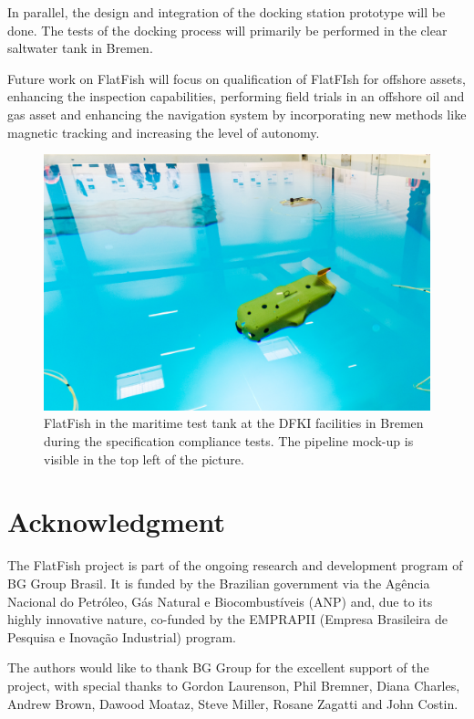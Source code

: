 \documentclass[conference]{IEEEtran}
\begin{document}
In parallel, the design and integration of the docking station prototype will be done. The 
tests of the docking process will primarily be performed in the clear saltwater tank in Bremen.

Future work on FlatFish will focus on qualification of FlatFIsh for offshore assets, enhancing 
the inspection capabilities, performing field trials in an offshore oil and gas asset and enhancing 
the navigation system by incorporating new methods like magnetic tracking 
\cite{christensen2015} and increasing the level of autonomy. 

\begin{figure}[!t]
	\centering
	\includegraphics[width=0.9\columnwidth]{FlatFish-2.jpg}
	\caption{FlatFish in the maritime test tank at the DFKI facilities in Bremen during the 
	specification compliance tests. The pipeline mock-up is visible in the top left of the 
	picture.}
	\label{fig:flatfish2}
\end{figure}

\section*{Acknowledgment}

The FlatFish project is part of the ongoing research and development program of BG Group 
Brasil. It is funded by the Brazilian government via the Agência Nacional do Petróleo, Gás 
Natural e Biocombustíveis (ANP) and, due to its highly innovative nature, co-funded by the 
EMPRAPII (Empresa Brasileira de Pesquisa e Inovação Industrial) program.

The authors would like to thank BG Group for the excellent support of the project, with
special thanks to Gordon Laurenson, Phil Bremner, Diana Charles, Andrew Brown, Dawood 
Moataz, Steve Miller, Rosane Zagatti and John Costin.







\end{document}
